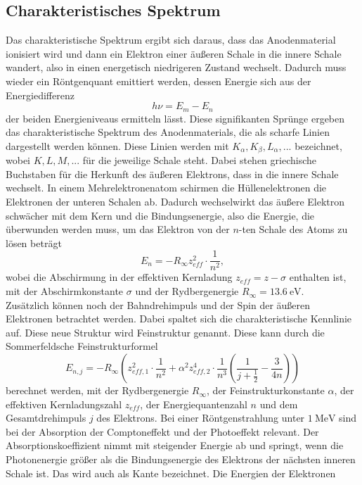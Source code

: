 \subsection{Charakteristisches Spektrum}
Das charakteristische Spektrum ergibt sich daraus, dass das Anodenmaterial ionisiert wird und dann ein Elektron einer äußeren Schale in die innere Schale wandert, also in einen energetisch niedrigeren Zustand wechselt. Dadurch muss wieder ein Röntgenquant emittiert werden, dessen Energie sich aus der Energiedifferenz 
\begin{equation}
  h\nu=E_{m}-E_{n}
  \label{2}
\end{equation}
der beiden Energieniveaus ermitteln lässt. Diese signifikanten Sprünge ergeben das charakteristische Spektrum des Anodenmaterials, die als scharfe Linien dargestellt werden können. Diese Linien werden mit $K_{\alpha}, K_{\beta}, L_{\alpha}, ...$ bezeichnet, wobei $K,L,M,...$ für die jeweilige Schale steht. Dabei stehen griechische Buchstaben für die Herkunft des äußeren Elektrons, dass in die innere Schale wechselt. In einem Mehrelektronenatom schirmen die Hüllenelektronen die Elektronen der unteren Schalen ab. Dadurch wechselwirkt das äußere Elektron schwächer mit dem Kern und die Bindungsenergie, also die Energie, die überwunden werden muss, um das Elektron von der $n$-ten Schale des Atoms zu lösen beträgt
\begin{equation}
  E_{n}=-R_{\infty}z_{eff}^2\cdot\frac{1}{n^2},
  \label{3}
\end{equation}
wobei die Abschirmung in der effektiven Kernladung $z_{eff}=z-\sigma$ enthalten ist, mit der Abschirmkonstante $\sigma$ und der Rydbergenergie $R_{\infty}=13.6\ \si{\eV}$.\\
Zusätzlich können noch der Bahndrehimpuls und der Spin der äußeren Elektronen betrachtet werden. Dabei spaltet sich die charakteristische Kennlinie auf. Diese neue Struktur wird Feinstruktur genannt. Diese kann durch die Sommerfeldsche Feinstrukturformel 
\begin{equation}
  E_{n,j}=-R_{\infty}\left(z^2_{eff,1}\cdot \frac{1}{n^2}+\alpha^2 z^4_{eff,2}\cdot\frac{1}{n^3}\left(\frac{1}{j+\frac{1}{2}}-\frac{3}{4n}\right)\right)
  \label{4}
\end{equation}
berechnet werden, mit der Rydbergenergie $R_{\infty}$, der Feinstrukturkonstante $\alpha$, der effektiven Kernladungszahl $z_{eff}$, der Energiequantenzahl $n$ und dem Gesamtdrehimpuls $j$ des Elektrons.
Bei einer Röntgenstrahlung unter $1\ \si{\MeV}$ sind bei der Absorption der Comptoneffekt und der Photoeffekt relevant. Der Absorptionskoeffizient nimmt mit steigender Energie ab und springt, wenn die Photonenergie größer als die Bindungsenergie des Elektrons der nächsten inneren Schale ist. Das wird auch als Kante bezeichnet. Die Energien der Elektronen 
